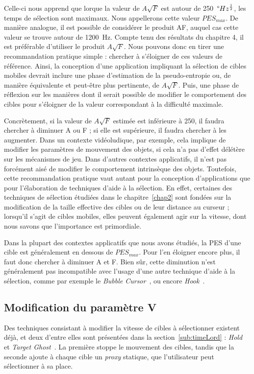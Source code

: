 	Celle-ci nous apprend que lorque la valeur de $A\sqrt{F}$ est autour de 250~$\degree{}Hz^{\frac{1}{2}}$, les temps de sélection sont maximaux. Nous appellerons cette valeur $PES_{max}$. De manière analogue, il est possible de considérer le produit AF, auquel cas cette valeur se trouve autour de 1200~\textdegree{}Hz. Compte tenu des résultats du chapitre 4, il est préférable d'utiliser le produit $A\sqrt{F}$. Nous pouvons donc en tirer une recommandation pratique simple : chercher à s'éloigner de ces valeurs de référence. Ainsi, la conception d'une application impliquant la sélection de cibles mobiles devrait inclure une phase d'estimation de la pseudo-entropie ou, de manière équivalente et peut-être plus pertinente, de $A\sqrt{F}$. Puis, une phase de réflexion sur les manières dont il serait possible de modifier le comportement des cibles pour s'éloigner de la valeur correspondant à la difficulté maximale.
	
	Concrètement, si la valeur de $A\sqrt{F}$ estimée est inférieure à 250, il faudra chercher à diminuer A ou F ; si elle est supérieure, il faudra chercher à les augmenter. Dans un contexte vidéoludique, par exemple, cela implique de modifier les paramètres de mouvement des objets, si cela n'a pas d'effet délétère sur les mécanismes de jeu. Dans d'autres contextes applicatifs, il n'est pas forcément aisé de modifier le comportement intrinsèque des objets. Toutefois, cette recommandation pratique vaut autant pour la conception d'applications que pour l'élaboration de techniques d'aide à la sélection. En effet, certaines des techniques de sélection étudiées dans le chapitre~\ref{chap2} sont fondées sur la modification de la taille effective des cibles ou de leur distance au curseur ; lorsqu'il s'agit de cibles mobiles, elles peuvent également agir sur la vitesse, dont nous savons que l'importance est primordiale.
	
	Dans la plupart des contextes applicatifs que nous avons étudiés, la PES d'une cible est généralement en dessous de $PES_{max}$. Pour l'en éloigner encore plus, il faut donc chercher à diminuer A et F. Bien sûr, cette diminution n'est généralement pas incompatible avec l'usage d'une autre technique d'aide à la sélection, comme par exemple le \emph{Bubble Cursor}~\cite{grossman2005bubble}, ou encore \emph{Hook}~\cite{ortega2013hook}.
	
	\subsection{Modification du paramètre V}
	Des techniques consistant à modifier la vitesse de cibles à sélectionner existent déjà, et deux d'entre elles sont présentées dans la section~\ref{sub:timeLord} : \emph{Hold}~\cite{hajri2011moving} et \emph{Target Ghost}~\cite{hasan2011comet}. La première stoppe le mouvement des cibles, tandis que la seconde ajoute à chaque cible un \emph{proxy} statique, que l'utilisateur peut sélectionner à sa place.
	
